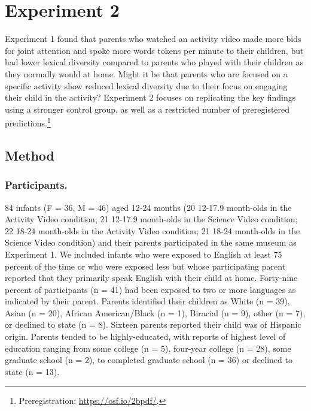 \documentclass[man,floatsintext]{apa6}
\begin{document}
\hypertarget{experiment-2}{%
\section{Experiment 2}\label{experiment-2}}

Experiment 1 found that parents who watched an activity video made more bids for joint attention and spoke more words tokens per minute to their children, but had lower lexical diversity compared to parents who played with their children as they normally would at home.
Might it be that parents who are focused on a specific activity show reduced lexical diversity due to their focus on engaging their child in the activity?
Experiment 2 focuses on replicating the key findings using a stronger control group, as well as a restricted number of preregistered predictions.\footnote{Preregistration: \href{https://osf.io/2bpdf}{https://osf.io/2bpdf/}.}

\hypertarget{method-1}{%
\subsection{Method}\label{method-1}}

\hypertarget{participants.-1}{%
\subsubsection{Participants.}\label{participants.-1}}

84 infants (F = 36, M = 46) aged 12-24 months
(20 12-17.9 month-olds in the Activity Video condition;
21 12-17.9 month-olds in the Science Video condition;
22 18-24 month-olds in the Activity Video condition;
21 18-24 month-olds in the Science Video condition) and their parents participated in the same museum as Experiment 1.
We included infants who were exposed to English at least 75 percent of the time or who were exposed less but whose participating parent reported that they primarily speak English with their child at home.
Forty-nine percent of participants (n = 41) had been exposed to two or more languages as indicated by their parent.
Parents identified their children as White (n = 39), Asian (n = 20), African American/Black (n = 1), Biracial (n = 9), other (n = 7), or declined to state (n = 8).
Sixteen parents reported their child was of Hispanic origin.
Parents tended to be highly-educated, with reports of highest level of education ranging from some college (n = 5), four-year college (n = 28), some graduate school (n = 2), to completed graduate school (n = 36) or declined to state (n = 13).
\end{document}
